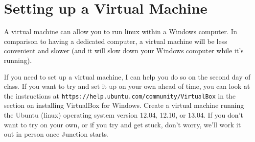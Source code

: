 \documentclass{article}
\begin{document}
\section*{Setting up a Virtual Machine}
A virtual machine can allow you to run linux within a Windows computer.  In comparison to having a dedicated computer, a virtual machine will be less convenient and slower (and it will slow down your Windows computer while it's running).

If you need to set up a virtual machine, I can help you do so on the second day of class.  If you want to try and set it up on your own ahead of time, you can look at the instructions at \texttt{https://help.ubuntu.com/community/VirtualBox} in the section on installing VirtualBox for Windows.  Create a virtual machine running the Ubuntu (linux) operating system version 12.04, 12.10, or 13.04.  If you don't want to try on your own, or if you try and get stuck, don't worry, we'll work it out in person once Junction starts.
\end{document}
